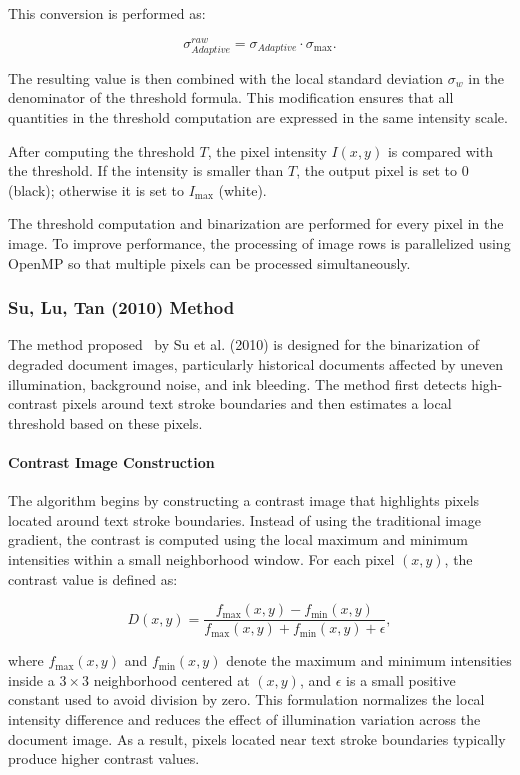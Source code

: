 This conversion is performed as:

\[
\sigma_{Adaptive}^{raw} =
\sigma_{Adaptive} \cdot \sigma_{\max}.
\]

The resulting value is then combined with the local standard deviation
$\sigma_w$ in the denominator of the threshold formula. This
modification ensures that all quantities in the threshold computation
are expressed in the same intensity scale.

After computing the threshold $T$, the pixel intensity $I(x,y)$ is
compared with the threshold. If the intensity is smaller than $T$, the
output pixel is set to $0$ (black); otherwise it is set to
$I_{\text{max}}$ (white).

The threshold computation and binarization are performed for every
pixel in the image. To improve performance, the processing of image
rows is parallelized using OpenMP so that multiple pixels can be
processed simultaneously.

\subsubsection{Su, Lu, Tan (2010) Method}

The method proposed~\cite{Su2010} by Su et al. (2010) is designed for the
binarization of degraded document images, particularly historical
documents affected by uneven illumination, background noise, and
ink bleeding. The method first detects high-contrast pixels around
text stroke boundaries and then estimates a local threshold based on
these pixels.

\paragraph{Contrast Image Construction}

The algorithm begins by constructing a contrast image that highlights
pixels located around text stroke boundaries. Instead of using the
traditional image gradient, the contrast is computed using the local
maximum and minimum intensities within a small neighborhood window.
For each pixel $(x,y)$, the contrast value is defined as:

\[
D(x,y) =
\frac{f_{\max}(x,y) - f_{\min}(x,y)}
     {f_{\max}(x,y) + f_{\min}(x,y) + \epsilon},
\]

where $f_{\max}(x,y)$ and $f_{\min}(x,y)$ denote the maximum and
minimum intensities inside a $3\times3$ neighborhood centered at
$(x,y)$, and $\epsilon$ is a small positive constant used to avoid
division by zero. This formulation normalizes the local intensity
difference and reduces the effect of illumination variation across
the document image. As a result, pixels located near text stroke
boundaries typically produce higher contrast values.

